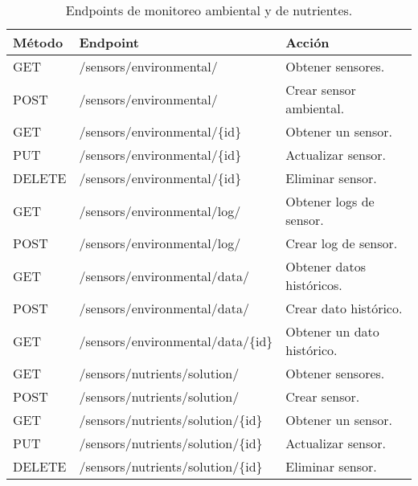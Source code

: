 \begin{table}[H]
    \centering
    \caption[Endpoints de monitoreo]{Endpoints de monitoreo ambiental y de nutrientes.}  
    \begin{tabular}{l l l}
        \toprule
        \textbf{Método} & \textbf{Endpoint}                       & \textbf{Acción}            \\
        \midrule
        GET             & /sensors/environmental/                 & Obtener sensores.          \\
        POST            & /sensors/environmental/                 & Crear sensor ambiental.    \\
        GET             & /sensors/environmental/\{id\}           & Obtener un sensor.         \\
        PUT             & /sensors/environmental/\{id\}           & Actualizar sensor.         \\
        DELETE          & /sensors/environmental/\{id\}           & Eliminar sensor.           \\
        \midrule
        GET             & /sensors/environmental/log/             & Obtener logs de sensor.    \\
        POST            & /sensors/environmental/log/             & Crear log de sensor.       \\
        \midrule
        GET             & /sensors/environmental/data/            & Obtener datos históricos.  \\
        POST            & /sensors/environmental/data/            & Crear dato histórico.      \\
        GET             & /sensors/environmental/data/\{id\}      & Obtener un dato histórico. \\
        \midrule
        GET             & /sensors/nutrients/solution/            & Obtener sensores.          \\
        POST            & /sensors/nutrients/solution/            & Crear sensor.              \\
        GET             & /sensors/nutrients/solution/\{id\}      & Obtener un sensor.         \\
        PUT             & /sensors/nutrients/solution/\{id\}      & Actualizar sensor.         \\
        DELETE          & /sensors/nutrients/solution/\{id\}      & Eliminar sensor.           \\

\end{tabular}
\end{table}
